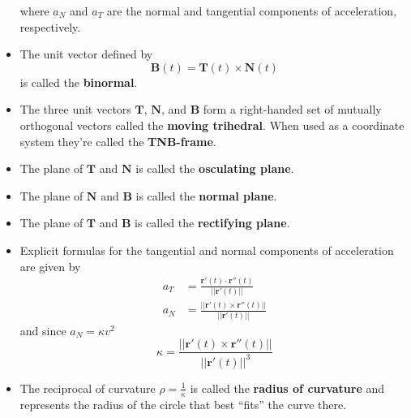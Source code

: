 \documentclass{article}
\begin{document}
\begin{itemize}
        where $a_N$ and $a_T$ are the normal and tangential components of acceleration, respectively.

  \item The unit vector defined by \[\mathbf{B}(t) = \mathbf{T}(t) \times \mathbf{N}(t)\] is called the \textbf{binormal}.

  \item The three unit vectors $\mathbf{T}$, $\mathbf{N}$, and $\mathbf{B}$ form a right-handed set of mutually orthogonal vectors called the \textbf{moving trihedral}. When used as a coordinate system they're called the \textbf{TNB-frame}.

  \item The plane of $\mathbf{T}$ and $\mathbf{N}$ is called the \textbf{osculating plane}.

  \item The plane of $\mathbf{N}$ and $\mathbf{B}$ is called the \textbf{normal plane}.

  \item The plane of $\mathbf{T}$ and $\mathbf{B}$ is called the \textbf{rectifying plane}.

  \item Explicit formulas for the tangential and normal components of acceleration are given by \begin{align*}
          a_T & = \frac{\mathbf{r}'(t) \cdot \mathbf{r}''(t)}{||\mathbf{r}'(t)||}      \\
          a_N & = \frac{||\mathbf{r}'(t) \times \mathbf{r}''(t)||}{||\mathbf{r}'(t)||}
        \end{align*} and since $a_N = \kappa v^2$ \[\kappa = \frac{||\mathbf{r}'(t) \times \mathbf{r}''(t)||}{||\mathbf{r}'(t)||^3}\]

  \item The reciprocal of curvature $\rho = \frac{1}{\kappa}$ is called the \textbf{radius of curvature} and represents the radius of the circle that best ``fits'' the curve there.
\end{itemize}
\end{document}
